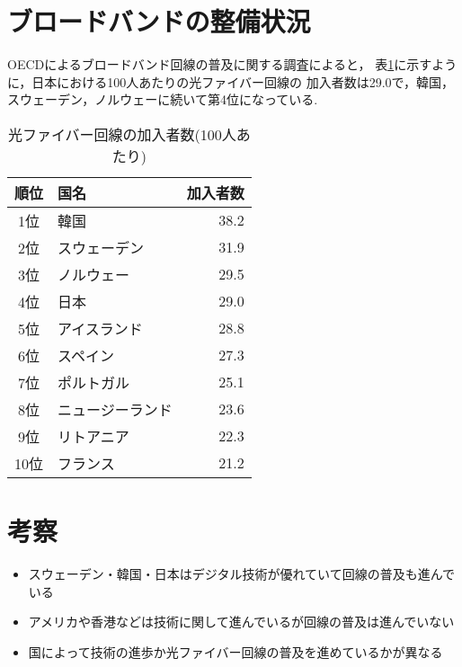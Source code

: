 \documentclass[a4paper,11pt,dvipdfmx]{ujarticle}
\begin{document}
\section{ブロードバンドの整備状況}
OECDによるブロードバンド回線の普及に関する調査\cite{oecd}によると，
表\ref{tbl:加入者数}に示すように，日本における100人あたりの光ファイバー回線の
加入者数は29.0で，韓国，スウェーデン，ノルウェーに続いて第4位になっている.
\begin{table}[htbp]
    \centering
    \caption{光ファイバー回線の加入者数(100人あたり)}
    \label{tbl:加入者数}

    \begin{tabular}{|c|l|r|}\hline
        順位 & 国名 & 加入者数 \\
        \hline
        1位 & 韓国 & 38.2 \\
        \hline
        2位 & スウェーデン & 31.9  \\
        \hline
        3位 & ノルウェー & 29.5  \\
        \hline
        4位 & 日本 & 29.0  \\
        \hline
        5位 & アイスランド & 28.8  \\
        \hline
        6位 & スペイン & 27.3  \\
        \hline 
        7位 & ポルトガル & 25.1  \\
        \hline
        8位 & ニュージーランド & 23.6  \\
        \hline 
        9位 & リトアニア & 22.3  \\
        \hline 
        10位 & フランス & 21.2  \\
        \hline 
    \end{tabular}
\end{table}
\section{考察}
\begin{itemize}
    \item スウェーデン・韓国・日本はデジタル技術が優れていて回線の普及も進んでいる
    \item アメリカや香港などは技術に関して進んでいるが回線の普及は進んでいない
    \item 国によって技術の進歩か光ファイバー回線の普及を進めているかが異なる
\end{itemize}
%


\end{document}
